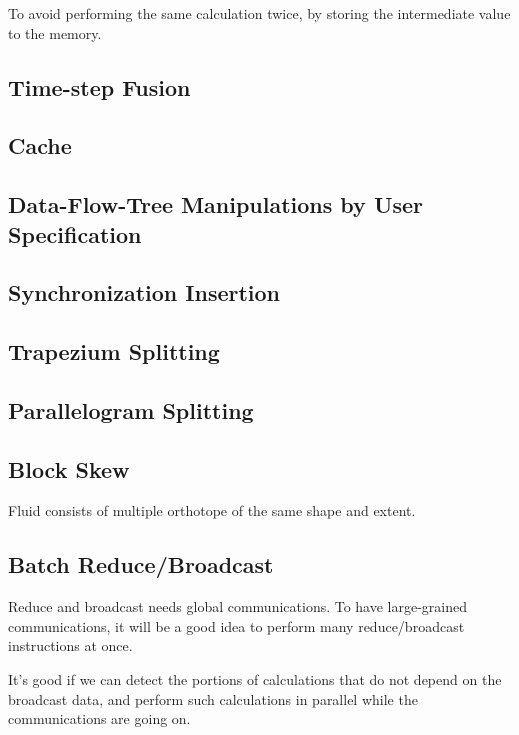 \documentclass[twocolumn]{article}
\begin{document}
To avoid performing the same calculation twice, by storing the intermediate
value to the memory. 

\subsection{Time-step Fusion}
\subsection{Cache}
\subsection{Data-Flow-Tree Manipulations by User Specification}
\subsection{Synchronization Insertion}
\subsection{Trapezium Splitting}
\subsection{Parallelogram Splitting}
\subsection{Block Skew}
Fluid consists of multiple orthotope of the same shape and extent.
\subsection{Batch Reduce/Broadcast}
Reduce and broadcast needs global communications. To have large-grained
communications, it will be a good idea to perform many reduce/broadcast
instructions at once. 

It's good if we can detect the portions of calculations that do not depend on
the broadcast data, and perform such calculations in parallel while the
communications are going on.


\end{document}
